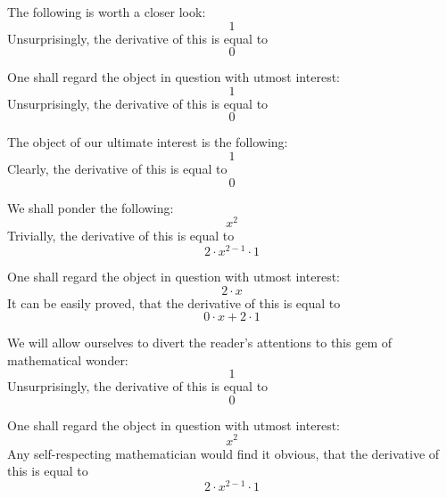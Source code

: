 \documentclass{article}
\begin{document}
The following is worth a closer look:
\begin{equation}
1 
\end{equation}
Unsurprisingly, the derivative of this is equal to
\begin{equation}
0 
\end{equation}

One shall regard the object in question with utmost interest:
\begin{equation}
1 
\end{equation}
Unsurprisingly, the derivative of this is equal to
\begin{equation}
0 
\end{equation}

The object of our ultimate interest is the following:
\begin{equation}
1 
\end{equation}
Clearly, the derivative of this is equal to
\begin{equation}
0 
\end{equation}

We shall ponder the following:
\begin{equation}
x ^{2 } 
\end{equation}
Trivially, the derivative of this is equal to
\begin{equation}
2 \cdot x ^{2 - 1 } \cdot 1 
\end{equation}

One shall regard the object in question with utmost interest:
\begin{equation}
2 \cdot x 
\end{equation}
It can be easily proved, that the derivative of this is equal to
\begin{equation}
0 \cdot x + 2 \cdot 1 
\end{equation}

We will allow ourselves to divert the reader's attentions to this gem of mathematical wonder:
\begin{equation}
1 
\end{equation}
Unsurprisingly, the derivative of this is equal to
\begin{equation}
0 
\end{equation}

One shall regard the object in question with utmost interest:
\begin{equation}
x ^{2 } 
\end{equation}
Any self-respecting mathematician would find it obvious, that the derivative of this is equal to
\begin{equation}
2 \cdot x ^{2 - 1 } \cdot 1 
\end{equation}
\end{document}
